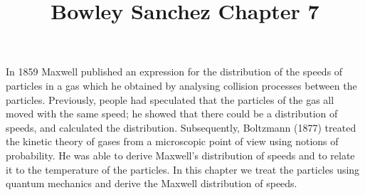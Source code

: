 \documentclass{../template/texnote}
\title{Bowley Sanchez Chapter 7}
\begin{document}
    \maketitle {}
In 1859 Maxwell published an expression for the distribution of the speeds of
particles in a gas which he obtained by analysing collision processes between
the particles. Previously, people had speculated that the particles of the gas all
moved with the same speed; he showed that there could be a distribution of
speeds, and calculated the distribution. Subsequently, Boltzmann (1877) treated
the kinetic theory of gases from a microscopic point of view using notions of
probability. He was able to derive Maxwell's distribution of speeds and to relate
it to the temperature of the particles. In this chapter we treat the particles using
quantum mechanics and derive the Maxwell distribution of speeds.\\

    \printbibliography
\end{document}
